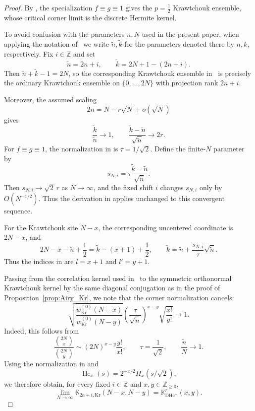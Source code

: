 \documentclass[reqno,11pt]{amsart}
\newcommand{\ZZ}{\mathbb{Z}}
\theoremstyle{plain}
\theoremstyle{definition}
\numberwithin{equation}{section}
\begin{document}
\begin{proof}
By \cite[Theorem~1.7 and Sections~4.4, 5.1]{betea2024},
the specialization $f\equiv g\equiv1$ gives the
$p=\frac12$ Krawtchouk ensemble, whose critical corner limit is
the discrete Hermite kernel.

To avoid confusion with the parameters $n,N$ used in the present
paper, when applying the notation of~\cite{betea2024} we write
$\widetilde n,\widetilde k$ for the parameters denoted there by
$n,k$, respectively. Fix $i\in\ZZ$ and set
\[
\widetilde n=2n+i,
\qquad
\widetilde k=2N+1-(2n+i).
\]
Then $\widetilde n+\widetilde k-1=2N$, so the corresponding
Krawtchouk ensemble in~\cite{betea2024} is precisely the ordinary
Krawtchouk ensemble on $\{0,\ldots,2N\}$ with projection rank
$2n+i$.

Moreover, the assumed scaling
\[
2n=N-r\sqrt N+o(\sqrt N)
\]
gives
\[
\frac{\widetilde k}{\widetilde n}\longrightarrow1,
\qquad
\frac{\widetilde k-\widetilde n}{\sqrt{\widetilde n}}
\longrightarrow2r.
\]
For $f\equiv g\equiv1$, the normalization in
\cite[Theorem~1.7]{betea2024} is $\tau=1/\sqrt2$. 
Define the finite-$N$ parameter by
\[
s_{N,i}
=
\tau\frac{\widetilde k-\widetilde n}
{\sqrt{\widetilde n}}.
\]
Then $s_{N,i}\longrightarrow\sqrt2\,r$ as $N\to\infty$, and the
fixed shift $i$ changes $s_{N,i}$ only by $O(N^{-1/2})$.
Thus the derivation in \cite[Section~4.4]{betea2024} applies unchanged
to this convergent sequence.

For the Krawtchouk site $N-x$, the corresponding uncentered coordinate is $2N-x$, and
\[
2N-x-\widetilde n+\frac12
=
\widetilde k-(x+1)+\frac12,
\qquad
\widetilde k
=
\widetilde n+
\frac{s_{N,i}}{\tau}\sqrt{\widetilde n}.
\]
Thus the indices in \cite[Theorem~1.7]{betea2024} are
$l=x+1$ and $l'=y+1$.

Passing from the correlation kernel used in~\cite{betea2024} to
the symmetric orthonormal Krawtchouk kernel by the same diagonal
conjugation as in the proof of Proposition~\ref{prop:Airy_Kr}, we
note that the corner normalization cancels:
\[
\sqrt{
\frac{w_{\mathrm{Kr}}^{(0)}(N-x)}
     {w_{\mathrm{Kr}}^{(0)}(N-y)}
}
\left(\frac{\tau}{\sqrt{\widetilde n}}\right)^{x-y}
\sqrt{\frac{x!}{y!}}
\longrightarrow1.
\]
Indeed, this follows from
\[
\frac{\binom{2N}{x}}{\binom{2N}{y}}
\sim
(2N)^{x-y}\frac{y!}{x!},
\qquad
\tau=\frac1{\sqrt2},
\qquad
\frac{\widetilde n}{N}\longrightarrow1.
\]
Using the normalization in
\cite[formulas~(4.35)--(4.38)]{betea2024} and
\[
\operatorname{He}_x(s)
=
2^{-x/2}H_x(s/\sqrt2),
\]
we therefore obtain, for every fixed $i\in\ZZ$ and
$x,y\in\ZZ_{\geq0}$,
\[
\lim_{N\to\infty}
\mathbb K_{2n+i,\mathrm{Kr}}(N-x,N-y)
=
\mathbb K_{\mathrm{DHe}^{+}}^r(x,y).
\]


\end{proof}
\end{document}
